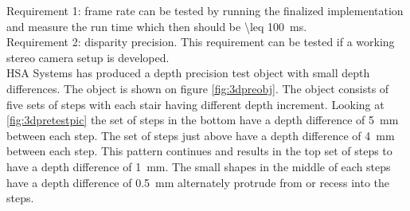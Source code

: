 Requirement 1: frame rate can be tested by running the finalized implementation and measure the run time which then should be \SI{\leq 100}{\milli\second}. \\

Requirement 2: disparity precision. This requirement can be tested if a working stereo camera setup is developed. \\
HSA Systems has produced a depth precision test object with small depth differences. The object is shown on figure \vref{fig:3dpreobj}. The object consists of five sets of steps with each stair having different depth increment. Looking at \vref{fig:3dpretestpic} the set of steps in the bottom have a depth difference of \SI{5}{\milli\meter} between each step. The set of steps just above have a depth difference of \SI{4}{\milli\meter} between each step. This pattern continues and results in the top set of steps to have a depth difference of \SI{1}{\milli\meter}. The small shapes in the middle of each steps have a depth difference of \SI{0.5}{\milli\meter} alternately protrude from or recess into the steps.\\


